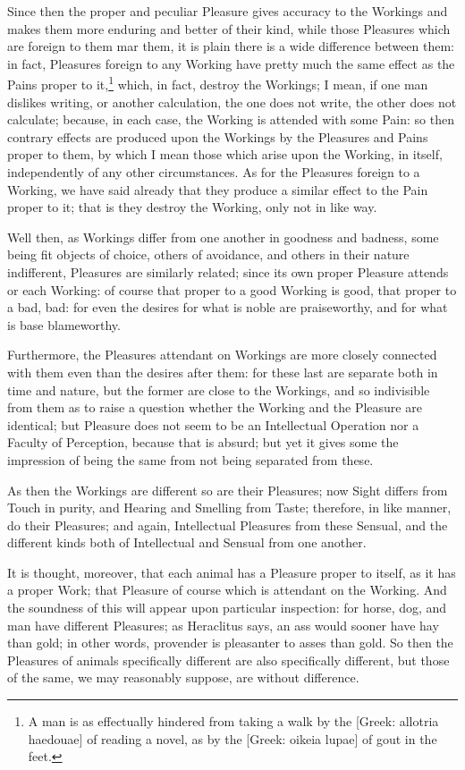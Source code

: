 Since then the proper and peculiar Pleasure gives accuracy to the Workings and
makes them more enduring and better of their kind, while those Pleasures which
are foreign to them mar them, it is plain there is a wide difference between
them: in fact, Pleasures foreign to any Working have pretty much the same
effect as the Pains proper to it,\footnote{A man is as effectually hindered from taking a walk by the [Greek: allotria
haedouae] of reading a novel, as by the [Greek: oikeia lupae] of gout in the
feet.}
which, in fact, destroy the Workings; I mean, if one man dislikes writing, or
another calculation, the one does not write, the other does not calculate;
because, in each case, the Working is attended with some Pain: so then contrary
effects are produced upon the Workings by the Pleasures and Pains proper to
them, by which I mean those which arise upon the Working, in itself,
independently of any other circumstances. As for the Pleasures foreign to a
Working, we have said already that they produce a similar effect to the Pain
proper to it; that is they destroy the Working, only not in like way.

Well then, as Workings differ from one another in goodness and badness, some
being fit objects of choice, others of avoidance, and others in their nature
indifferent, Pleasures are similarly related; since its own proper Pleasure
attends or each Working: of course that proper to a good Working is good, that
proper to a bad, bad: for even the desires for what is noble are praiseworthy,
and for what is base blameworthy.

Furthermore, the Pleasures attendant on Workings are more closely connected
with them even than the desires after them: for these last are separate both in
time and nature, but the former are close to the Workings, and so indivisible
from them as to raise a question whether the Working and the Pleasure are
identical; but Pleasure does not seem to be an Intellectual Operation nor a
Faculty of Perception, because that is absurd; but yet it gives some the
impression of being the same from not being separated from these.

As then the Workings are different so are their Pleasures; now Sight differs
from Touch in purity, and Hearing and Smelling from Taste; therefore, in like
manner, do their Pleasures; and again, Intellectual Pleasures from these
Sensual, and the different kinds both of Intellectual and Sensual from one
another.

It is thought, moreover, that each animal has a Pleasure proper to itself, as
it has a proper Work; that Pleasure of course which is attendant on the
Working. And the soundness of this will appear upon particular inspection: for
horse, dog, and man have different Pleasures; as Heraclitus says, an ass would
sooner have hay than gold; in other words, provender is pleasanter to asses
than gold. So then the Pleasures of animals specifically different are also
specifically different, but those of the same, we may reasonably suppose, are
without difference.

